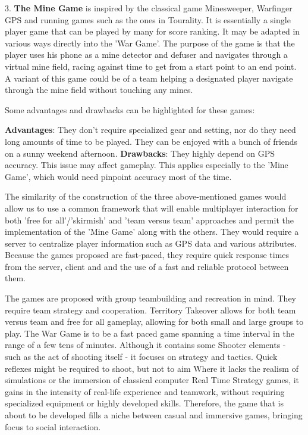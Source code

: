 3. \textbf{The Mine Game} is inspired by the classical game Minesweeper,
Warfinger GPS and running games such as the ones in Tourality. It is essentially
a single player game that can be played by many for score ranking. It may be
adapted in various ways directly into the 'War Game'. The purpose of the game is
that the player uses his phone as a mine detector and defuser and navigates
through a virtual mine field, racing against time to get from a start point to
an end point. A variant of this game could be of a team helping a designated
player navigate through the mine field without touching any mines.\newline

Some advantages and drawbacks can be highlighted for these games:\newline

\textbf{Advantages}: They don't require specialized gear and setting, nor
do they need long amounts of time to be played. They can be enjoyed with a
bunch of friends on a sunny weekend afternoon.\newline
\textbf{Drawbacks}: They highly depend on GPS accuracy. This issue may
affect gameplay. This applies especially to the 'Mine Game', which would need
pinpoint accuracy most of the time. \newline

The similarity of the construction of the three above-mentioned games would
allow us to use a common framework that will enable multiplayer interaction for
both 'free for all'/'skirmish' and 'team versus team' approaches and permit the
implementation of the 'Mine Game' along with the others. They would require a
server to centralize player information such as GPS data and various attributes.
Because the games proposed are fast-paced, they require quick response times
from the server, client and and the use of a fast and reliable protocol between
them.\newline

The games are proposed with group teambuilding and recreation in mind. They
require team strategy and cooperation. Territory Takeover allows for both team
versus team and free for all gameplay, allowing for both small and large groups
to play. The War Game is to be a fast paced game spanning a time interval in the
range of a few tens of minutes. Although it contains some Shooter elements -
such as the act of shooting itself - it focuses on strategy and tactics. Quick
reflexes might be required to shoot, but not to aim Where it lacks the realism
of simulations or the immersion of classical computer Real Time Strategy games,
it gains in the intensity of real-life experience and teamwork, without requiring
specialized equipment or highly developed skills. Therefore, the game that is
about to be developed fills a niche between casual and immersive games, bringing
focus to social interaction.\newline

